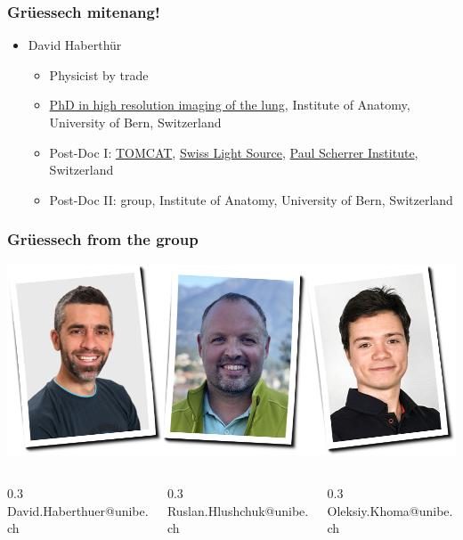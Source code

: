 

\begin{frame}
	\maketitle
\end{frame}

\begin{frame}
	\frametitle{Grüessech mitenang!}
	\begin{itemize}
		\item David Haberthür
		\begin{itemize}
			\item Physicist by trade
			\item \href{https://boris.unibe.ch/2619/}{PhD in high resolution imaging of the lung}, Institute of Anatomy, University of Bern, Switzerland
			\item Post-Doc I: \href{https://www.psi.ch/sls/tomcat/}{TOMCAT}, \href{https://www.psi.ch/sls/}{Swiss Light Source}, \href{https://www.psi.ch/}{Paul Scherrer Institute}, Switzerland
			\item Post-Doc II: \uct group, Institute of Anatomy, University of Bern, Switzerland
		\end{itemize}
	\end{itemize}
\end{frame}

\begin{frame}
	\frametitle{Grüessech from the \uct group}
	\centering
	\includegraphics[width=\imagewidth]{./images/team}
		\begin{columns}
		\hfill\begin{column}{0.3\imagewidth}
			\centering%
			David{\color{ubRed}.}Haberthuer{\color{ubRed}@unibe.ch}%
		\end{column}
		\begin{column}{0.3\imagewidth}
			\centering%
			Ruslan{\color{ubRed}.}Hlushchuk{\color{ubRed}@unibe.ch}%
		\end{column}
		\begin{column}{0.3\imagewidth}
			\centering%
			Oleksiy{\color{ubRed}.}Khoma{\color{ubRed}@unibe.ch}%
		\end{column}\hfill%
	\end{columns}
\end{frame}

